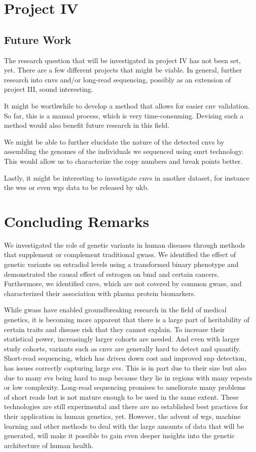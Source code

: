 \documentclass[draft]{scrbook}
\begin{document}
\chapter{Project IV}
\section{Future Work}
The research question that will be investigated in project IV has not been set, yet.
There are a few different projects that might be viable.
In general, further research into \glspl{cnv} and/or long-read sequencing, possibly as an extension of project III, sound interesting.

It might be worthwhile to develop a method that allows for easier \gls{cnv} validation.
So far, this is a manual process, which is very time-consuming.
Devising such a method would also benefit future research in this field.

We might be able to further elucidate the nature of the detected \glspl{cnv} by assembling the genomes of the individuals we sequenced using \gls{smrt} technology.
This would allow us to characterize the copy numbers and break points better.

Lastly, it might be interesting to investigate \glspl{cnv} in another dataset, for instance the \gls{wes} or even \gls{wgs} data to be released by \gls{ukb}.

\chapter{Concluding Remarks}
We investigated the role of genetic variants in human diseases through methods that supplement or complement traditional \glspl{gwas}.
We identified the effect of genetic variants on estradiol levels using a transformed binary phenotype and demonstrated the causal effect of estrogen on \gls{bmd} and certain cancers.
Furthermore, we identified \glspl{cnv}, which are not covered by common \glspl{gwas}, and characterized their association with plasma protein biomarkers.

While \glspl{gwas} have enabled groundbreaking research in the field of medical genetics, it is becoming more apparent that there is a large part of heritability of certain traits and disease risk that they cannot explain.
To increase their statistical power, increasingly larger cohorts are needed.
And even with larger study cohorts, variants such as \glspl{cnv} are generally hard to detect and quantify.
Short-read sequencing, which has driven down cost and improved \gls{snp} detection, has issues correctly capturing large \glspl{sv}.
This is in part due to their size but also due to many \glspl{sv} being hard to map because they lie in regions with many repeats or low complexity.
Long-read sequencing promises to ameliorate many problems of short reads but is not mature enough to be used in the same extent.
These technologies are still experimental and there are no established best practices for their application in human genetics, yet.
However, the advent of \gls{wgs}, machine learning and other methods to deal with the large amounts of data that will be generated, will make it possible to gain even deeper insights into the genetic architecture of human health.
\end{document}
